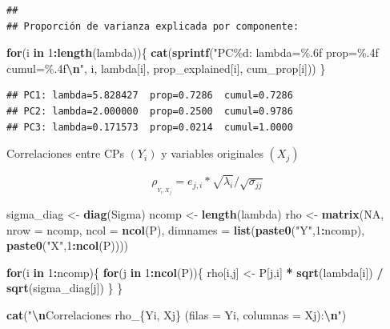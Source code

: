 \documentclass[
]{book}
\newenvironment{Shaded}{\begin{snugshade}}{\end{snugshade}}
\newcommand{\AttributeTok}[1]{\textcolor[rgb]{0.13,0.29,0.53}{#1}}
\newcommand{\ConstantTok}[1]{\textcolor[rgb]{0.56,0.35,0.01}{#1}}
\newcommand{\ControlFlowTok}[1]{\textcolor[rgb]{0.13,0.29,0.53}{\textbf{#1}}}
\newcommand{\DecValTok}[1]{\textcolor[rgb]{0.00,0.00,0.81}{#1}}
\newcommand{\FunctionTok}[1]{\textcolor[rgb]{0.13,0.29,0.53}{\textbf{#1}}}
\newcommand{\NormalTok}[1]{#1}
\newcommand{\OtherTok}[1]{\textcolor[rgb]{0.56,0.35,0.01}{#1}}
\newcommand{\SpecialCharTok}[1]{\textcolor[rgb]{0.81,0.36,0.00}{\textbf{#1}}}
\newcommand{\StringTok}[1]{\textcolor[rgb]{0.31,0.60,0.02}{#1}}
\begin{document}
\begin{verbatim}
## 
## Proporción de varianza explicada por componente:
\end{verbatim}

\begin{Shaded}
\begin{Highlighting}[]
\ControlFlowTok{for}\NormalTok{(i }\ControlFlowTok{in} \DecValTok{1}\SpecialCharTok{:}\FunctionTok{length}\NormalTok{(lambda))\{}
  \FunctionTok{cat}\NormalTok{(}\FunctionTok{sprintf}\NormalTok{(}\StringTok{"PC\%d: lambda=\%.6f  prop=\%.4f  cumul=\%.4f}\SpecialCharTok{\textbackslash{}n}\StringTok{"}\NormalTok{,}
\NormalTok{              i, lambda[i], prop\_explained[i], cum\_prop[i]))}
\NormalTok{\}}
\end{Highlighting}
\end{Shaded}

\begin{verbatim}
## PC1: lambda=5.828427  prop=0.7286  cumul=0.7286
## PC2: lambda=2.000000  prop=0.2500  cumul=0.9786
## PC3: lambda=0.171573  prop=0.0214  cumul=1.0000
\end{verbatim}

Correlaciones entre CPs \((Y_i)\) y variables originales \((X_j)\)

\[\rho_{_{Y_i, X_j}} = e_{j,i} * \sqrt{\lambda_i} / \sqrt{\sigma_{jj}}\]

\begin{Shaded}
\begin{Highlighting}[]
\NormalTok{sigma\_diag }\OtherTok{\textless{}{-}} \FunctionTok{diag}\NormalTok{(Sigma)}
\NormalTok{ncomp }\OtherTok{\textless{}{-}} \FunctionTok{length}\NormalTok{(lambda)}
\NormalTok{rho }\OtherTok{\textless{}{-}} \FunctionTok{matrix}\NormalTok{(}\ConstantTok{NA}\NormalTok{, }\AttributeTok{nrow =}\NormalTok{ ncomp, }\AttributeTok{ncol =} \FunctionTok{ncol}\NormalTok{(P),}
              \AttributeTok{dimnames =} \FunctionTok{list}\NormalTok{(}\FunctionTok{paste0}\NormalTok{(}\StringTok{"Y"}\NormalTok{,}\DecValTok{1}\SpecialCharTok{:}\NormalTok{ncomp), }\FunctionTok{paste0}\NormalTok{(}\StringTok{"X"}\NormalTok{,}\DecValTok{1}\SpecialCharTok{:}\FunctionTok{ncol}\NormalTok{(P))))}

\ControlFlowTok{for}\NormalTok{(i }\ControlFlowTok{in} \DecValTok{1}\SpecialCharTok{:}\NormalTok{ncomp)\{}
  \ControlFlowTok{for}\NormalTok{(j }\ControlFlowTok{in} \DecValTok{1}\SpecialCharTok{:}\FunctionTok{ncol}\NormalTok{(P))\{}
\NormalTok{    rho[i,j] }\OtherTok{\textless{}{-}}\NormalTok{ P[j,i] }\SpecialCharTok{*} \FunctionTok{sqrt}\NormalTok{(lambda[i]) }\SpecialCharTok{/} \FunctionTok{sqrt}\NormalTok{(sigma\_diag[j])}
\NormalTok{  \}}
\NormalTok{\}}

\FunctionTok{cat}\NormalTok{(}\StringTok{"}\SpecialCharTok{\textbackslash{}n}\StringTok{Correlaciones rho\_\{Yi, Xj\} (filas = Yi, columnas = Xj):}\SpecialCharTok{\textbackslash{}n}\StringTok{"}\NormalTok{)}
\end{Highlighting}
\end{Shaded}
\end{document}
